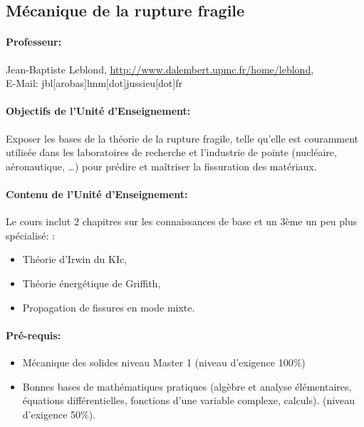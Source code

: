 \subsection{Mécanique de la rupture fragile}

\paragraph{Professeur:} 
Jean-Baptiste Leblond, \url{http://www.dalembert.upmc.fr/home/leblond},\\ E-Mail: jbl[arobas]lmm[dot]jussieu[dot]fr


\paragraph{Objectifs de l'Unité d'Enseignement:}
Exposer les bases de la théorie de la rupture fragile, telle qu’elle est couramment utilisée dans les laboratoires de recherche et l’industrie de pointe (nucléaire, aéronautique, …) pour prédire et maîtriser la fissuration des matériaux.




\paragraph{Contenu de l’Unité d’Enseignement:}
Le cours inclut 2 chapitres sur les connaissances de base et un 3ème un peu plus spécialisé: : 
\begin{itemize}
 \item Théorie d’Irwin du KIc,
 \item Théorie énergétique de Griffith,
 \item Propagation de fissures en mode mixte.
\end{itemize}

\paragraph{Pré-requis:}

\begin{itemize}
\item Mécanique des solides niveau Master 1 (niveau d'exigence 100\%)
\item Bonnes bases de mathématiques pratiques (algèbre et analyse élémentaires, équations différentielles, fonctions d’une variable complexe, calculs). (niveau d'exigence 50\%).
\end{itemize}

